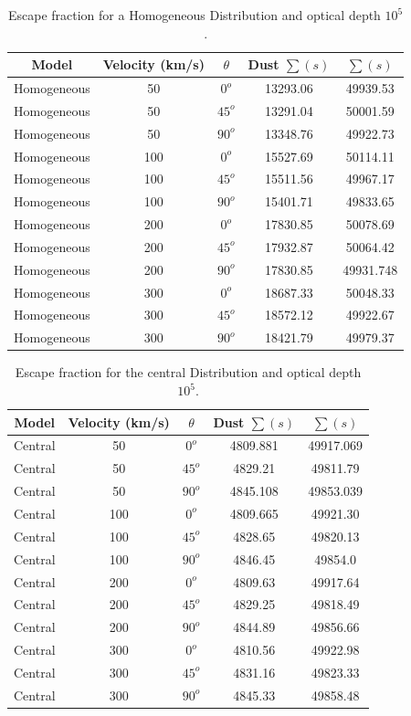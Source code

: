 \documentclass[usenatbib]{mn2e}
\begin{document}
\begin{table}[H]
\begin{center}
\begin{tabular}{ccccc}\hline 
Model & Velocity (km/s) & $\theta$ & Dust $\sum (s)$& $\sum (s)$\\ \hline 
Homogeneous & 50 & $0^{o}$& 13293.06 &49939.53\\ 
Homogeneous & 50 & $45^{o}$& 13291.04 &50001.59\\ 
Homogeneous & 50 & $90^{o}$ & 13348.76 &49922.73\\ 
Homogeneous & 100 & $0^{o}$ & 15527.69 &50114.11\\ 
Homogeneous & 100 & $45^{o}$ & 15511.56 &49967.17\\ 
Homogeneous & 100 & $90^{o}$ & 15401.71 & 49833.65\\ 
Homogeneous & 200 & $0^{o}$  & 17830.85 & 50078.69\\ 
Homogeneous & 200 & $45^{o}$ & 17932.87 & 50064.42\\ 
Homogeneous & 200 & $90^{o}$ & 17830.85  & 49931.748\\ 
Homogeneous & 300 & $ 0^{o}$ & 18687.33 & 50048.33 \\ 
Homogeneous & 300 & $45^{o}$ & 18572.12& 49922.67\\ 
Homogeneous & 300 & $90^{o}$ & 18421.79 & 49979.37\\ \hline
\end{tabular}
\caption{Escape fraction for a Homogeneous Distribution and optical depth $10^{5}$.} 
\end{center}
\end{table}


\begin{table}
\begin{center}
\begin{tabular}{ccccc} \hline 
Model & Velocity (km/s) & $\theta$ & Dust $\sum (s)$& $\sum (s)$ \\  \hline 
Central & 50 & $0^{o}$ & 4809.881 & 49917.069 \\ 
Central & 50 & $45^{o}$ & 4829.21 & 49811.79 \\ 
Central & 50 & $90^{o}$ & 4845.108 & 49853.039\\ 
Central & 100 & $0^{o}$ & 4809.665 & 49921.30 \\  
Central & 100 & $45^{o}$ & 4828.65 & 49820.13 \\ 
Central & 100 & $90^{o}$ & 4846.45 & 49854.0 \\ 
Central & 200 & $0^{o}$  & 4809.63 & 49917.64 \\ 
Central & 200 & $45^{o}$ & 4829.25 & 49818.49 \\ 
Central & 200 & $90^{o}$ & 4844.89 & 49856.66 \\ 
Central & 300 & $ 0^{o}$ & 4810.56 & 49922.98\\ 
Central & 300 & $45^{o}$ & 4831.16 & 49823.33\\ 
Central & 300 & $90^{o}$ & 4845.33 & 49858.48\\ \hline
\end{tabular}
\caption{Escape fraction for the central Distribution and optical depth $10^{5}$.} 
\end{center}
\end{table}
\end{document}

